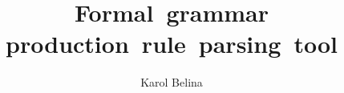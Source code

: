 \documentclass[english,engineering]{wizthesis}
\author{Karol Belina}
\title{Formal grammar production rule parsing tool}
\begin{document}
\frontmatter %

\maketitle

\nocite{*}



\listoffigures

\listoftables

\listoflistings
\end{document}
